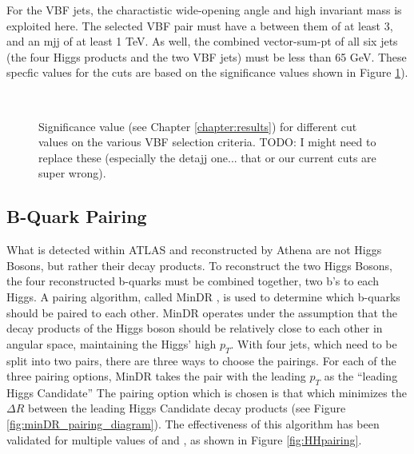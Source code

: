         For the VBF jets, the charactistic wide-opening angle and high invariant mass is exploited here.
        The selected VBF pair must have a \deta between them of at least 3,
            and an mjj of at least 1 TeV.
        As well, the combined vector-sum-pt of all six jets
            (the four Higgs products and the two VBF jets)
            must be less than 65 GeV.
        These specfic values for the cuts are based on the significance values shown in Figure \ref{fig:vbf_cuts}).

        \begin{figure}[tbh]
            \\
            \caption{
                Significance value (see Chapter \ref{chapter:results})
                    for different cut values on the various VBF selection criteria\cite{vbf_hh_4b_2018_int}.
                TODO: I might need to replace these (especially the detajj one... that or our current cuts are super wrong).
            }
            \label{fig:vbf_cuts}
        \end{figure}
        \FloatBarrier


    \subsection{B-Quark Pairing}

        What is detected within ATLAS and reconstructed by Athena are not Higgs Bosons, but rather their decay products.
        To reconstruct the two Higgs Bosons, the four reconstructed b-quarks must be combined together, two b's to each Higgs.
        A pairing algorithm, called MinDR \cite{hh4b_2021_int_note},
            is used to determine which b-quarks should be paired to each other.
        MinDR operates under the assumption that the decay products of the Higgs boson
            should be relatively close to each other in angular space, maintaining the Higgs' high $p_T$.
        With four jets, which need to be split into two pairs, there are three ways to choose the pairings.
        For each of the three pairing options, MinDR takes the pair with the leading $p_T$ as the ``leading Higgs Candidate''
        The pairing option which is chosen is that which minimizes the $\Delta R$ between the leading Higgs Candidate decay products
            (see Figure \ref{fig:minDR_pairing_diagram}).
        The effectiveness of this algorithm has been validated for multiple values of \kvv and \kl,
            as shown in Figure \ref{fig:HHpairing}.

